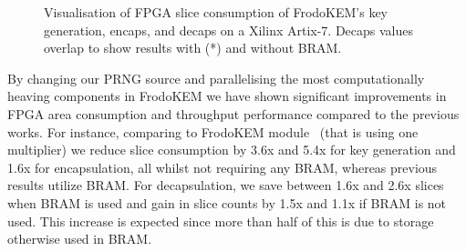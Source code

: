 \begin{table}
\centering
\caption{FPGA resource consumption of the proposed PRNG and Error Sampler designs on a Xilinx Artix-7 FPGA.}\label{tab:otherresults}
\end{table}

\begin{figure}
\centering
\resizebox{\columnwidth}{!}{


}
\caption{Visualisation of FPGA slice consumption of FrodoKEM's key generation, encaps, and decaps on a Xilinx Artix-7. Decaps values overlap to show results with (*) and without BRAM.}
\label{fig:hw}
\end{figure}

By changing our PRNG source and parallelising the most computationally heaving components in FrodoKEM we have shown significant improvements in FPGA area consumption and throughput performance compared to the previous works. For instance, comparing to FrodoKEM module~\cite{howe2018standard} (that is using one multiplier) we reduce slice consumption by 3.6x and 5.4x for key generation and 1.6x for encapsulation, all whilst not requiring any BRAM, whereas previous results utilize BRAM. For decapsulation, we save between 1.6x and 2.6x slices when BRAM is used and gain in slice counts by 1.5x and 1.1x if BRAM is not used. This increase is expected since more than half of this is due to storage otherwise used in BRAM.

